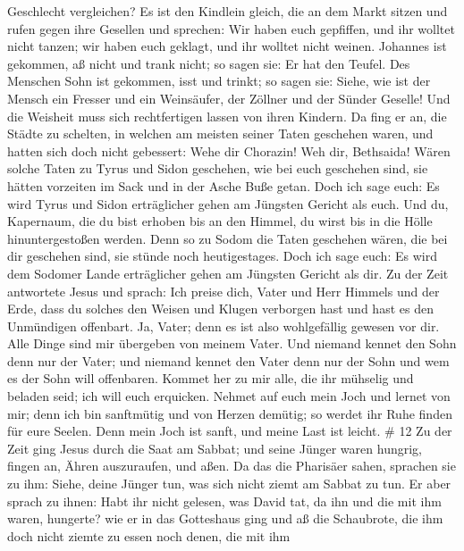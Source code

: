 Geschlecht vergleichen? Es ist den Kindlein gleich, die an dem Markt
sitzen und rufen gegen ihre Gesellen  und sprechen: Wir
haben euch gepfiffen, und ihr wolltet nicht tanzen; wir haben euch
geklagt, und ihr wolltet nicht weinen.  Johannes ist
gekommen, aß nicht und trank nicht; so sagen sie: Er hat den Teufel.
 Des Menschen Sohn ist gekommen, isst und trinkt; so sagen
sie: Siehe, wie ist der Mensch ein Fresser und ein Weinsäufer, der
Zöllner und der Sünder Geselle! Und die Weisheit muss sich rechtfertigen
lassen von ihren Kindern.  Da fing er an, die Städte zu
schelten, in welchen am meisten seiner Taten geschehen waren, und hatten
sich doch nicht gebessert:  Wehe dir Chorazin! Weh dir,
Bethsaida! Wären solche Taten zu Tyrus und Sidon geschehen, wie bei euch
geschehen sind, sie hätten vorzeiten im Sack und in der Asche Buße
getan.  Doch ich sage euch: Es wird Tyrus und Sidon
erträglicher gehen am Jüngsten Gericht als euch.  Und du,
Kapernaum, die du bist erhoben bis an den Himmel, du wirst bis in die
Hölle hinuntergestoßen werden. Denn so zu Sodom die Taten geschehen
wären, die bei dir geschehen sind, sie stünde noch heutigestages.
 Doch ich sage euch: Es wird dem Sodomer Lande erträglicher
gehen am Jüngsten Gericht als dir.  Zu der Zeit antwortete
Jesus und sprach: Ich preise dich, Vater und Herr Himmels und der Erde,
dass du solches den Weisen und Klugen verborgen hast und hast es den
Unmündigen offenbart.  Ja, Vater; denn es ist also
wohlgefällig gewesen vor dir.  Alle Dinge sind mir
übergeben von meinem Vater. Und niemand kennet den Sohn denn nur der
Vater; und niemand kennet den Vater denn nur der Sohn und wem es der
Sohn will offenbaren.  Kommet her zu mir alle, die ihr
mühselig und beladen seid; ich will euch erquicken.  Nehmet
auf euch mein Joch und lernet von mir; denn ich bin sanftmütig und von
Herzen demütig; so werdet ihr Ruhe finden für eure Seelen. 
Denn mein Joch ist sanft, und meine Last ist leicht. \# 12 
Zu der Zeit ging Jesus durch die Saat am Sabbat; und seine Jünger waren
hungrig, fingen an, Ähren auszuraufen, und aßen.  Da das die
Pharisäer sahen, sprachen sie zu ihm: Siehe, deine Jünger tun, was sich
nicht ziemt am Sabbat zu tun.  Er aber sprach zu ihnen: Habt
ihr nicht gelesen, was David tat, da ihn und die mit ihm waren,
hungerte?  wie er in das Gotteshaus ging und aß die
Schaubrote, die ihm doch nicht ziemte zu essen noch denen, die mit ihm
